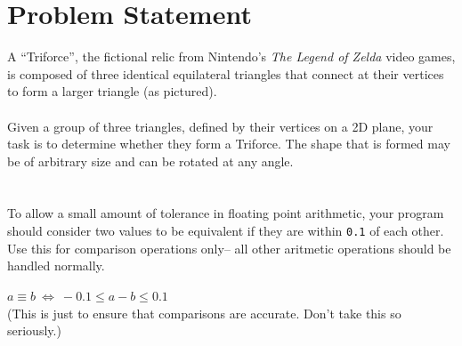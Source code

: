 \documentclass[11pt]{article}
\begin{document}
\pagestyle{fancy}



\section{Problem Statement}

\begin{figure}
\end{figure}
A ``Triforce'', the fictional relic from Nintendo's \emph{The Legend of Zelda}
video games, is composed of three identical equilateral triangles that connect
at their vertices to form a larger triangle (as pictured).
\\\\
Given a group of three triangles, defined by their vertices on a 2D plane,
your task is to determine whether they form a Triforce. The shape that is
formed may be of arbitrary size and can be rotated at any angle.\\
\\\\
To allow a small amount of tolerance in floating point arithmetic,
your program should consider two values to be equivalent if they are within
\texttt{0.1} of each other. Use this for comparison operations only-- all other
aritmetic operations should be handled normally.
\begin{center}
$a \equiv b\ \iff\ -0.1 \le a - b \le 0.1$
\\\bigskip
\small(This is just to ensure that comparisons are accurate. Don't take this
so seriously.)
\end{center}
\end{document}
